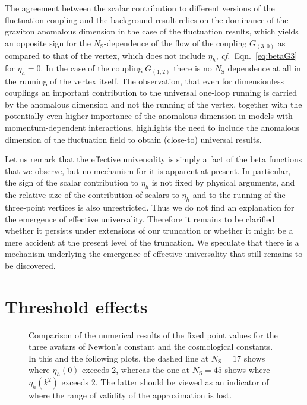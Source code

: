 \documentclass[11pt]{book}
\newcommand\NS{ N_{\scriptscriptstyle{\mathrm{S}}} }
\newcommand\cf{\textit{cf.}\ }
\numberwithin{equation}{chapter}
\begin{document}
The agreement between the scalar contribution to different versions of the fluctuation coupling and
the background result relies on the dominance of the graviton anomalous dimension in the case of the
fluctuation results,
which yields an opposite sign for the $\NS$-dependence of the flow of the coupling $G_{(3,0)}$
as compared to that of the vertex, which does not include $\eta_h$, \cf Eqn.~\eqref{eq:betaG3} for $\eta_h=0$.
In the case of the coupling $G_{(1,2)}$ there is no $\NS$ dependence at all in the running
of the vertex itself.
The observation, that even for dimensionless couplings an important contribution to the
universal one-loop running is carried by the anomalous dimension and not the running of the vertex,
together with the potentially even higher importance of the anomalous dimension in models
with momentum-dependent interactions,
highlights the need to include the anomalous dimension of the fluctuation field to obtain
(close-to) universal results.

Let us remark that the effective universality is simply a fact of the beta functions that we observe,
but no mechanism for it is apparent at present.
In particular, the sign of the scalar contribution to $\eta_h$ is not fixed by physical arguments,
and the relative size of the contribution of scalars to $\eta_h$ and to the running of
the three-point vertices is also unrestricted.
Thus we do not find an explanation for the emergence of effective universality.
Therefore it remains to be clarified whether it persists under extensions of our truncation or
whether it might be a mere accident at the present level of the truncation.
We speculate that there is a mechanism underlying the emergence of effective universality that
still remains to be discovered.

\section{Threshold effects}

\begin{figure}[t]
  \begin{center}
    
  \end{center}
  \caption{
    Comparison of the numerical results of the fixed point values
    for the three avatars of Newton's constant and the cosmological
    constants.
    In this and the following plots, the dashed line at $\NS = 17$
    shows where $\eta_h(0)$ exceeds 2, whereas the one at $\NS = 45$
    shows where $\eta_h(k^2)$ exceeds 2.
    The latter should be viewed as an indicator of where the range of
    validity of the approximation is lost.
  }
  \label{fig:allFPvalues}
\end{figure}
\end{document}
